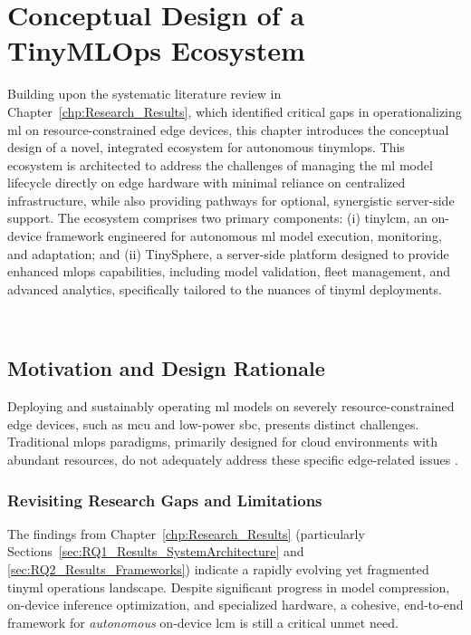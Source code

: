 
\chapter{Conceptual Design of a TinyMLOps Ecosystem}
\label{chp:Framework}

Building upon the systematic literature review in Chapter~\ref{chp:Research_Results}, which identified critical gaps in operationalizing \gls{ml} on resource-constrained edge devices, this chapter introduces the conceptual design of a novel, integrated ecosystem for autonomous \gls{tinymlops}. This ecosystem is architected to address the challenges of managing the \gls{ml} model lifecycle directly on edge hardware with minimal reliance on centralized infrastructure, while also providing pathways for optional, synergistic server-side support. The ecosystem comprises two primary components: (i) \gls{tinylcm}, an on-device framework engineered for autonomous \gls{ml} model execution, monitoring, and adaptation; and (ii) TinySphere, a server-side platform designed to provide enhanced \gls{mlops} capabilities, including model validation, fleet management, and advanced analytics, specifically tailored to the nuances of \gls{tinyml} deployments.

~\\
\vfill
\minitoc
\clearpage

\section{Motivation and Design Rationale}
\label{sec:framework_motivation_rationale}

Deploying and sustainably operating \gls{ml} models on severely resource-constrained edge devices, such as \gls{mcu} and low-power \gls{sbc}, presents distinct challenges. Traditional \gls{mlops} paradigms, primarily designed for cloud environments with abundant resources, do not adequately address these specific edge-related issues \cite{lerouxTinyMLOpsOperationalChallenges2022a, szydloManagementTinyMLEnabled2024}.

\subsection{Revisiting Research Gaps and Limitations}
\label{ssec:framework_revisiting_gaps}

The findings from Chapter~\ref{chp:Research_Results} (particularly Sections~\ref{sec:RQ1_Results_SystemArchitecture} and \ref{sec:RQ2_Results_Frameworks}) indicate a rapidly evolving yet fragmented \gls{tinyml} operations landscape. Despite significant progress in model compression, on-device inference optimization, and specialized hardware, a cohesive, end-to-end framework for \textit{autonomous} on-device \gls{lcm} is still a critical unmet need.

